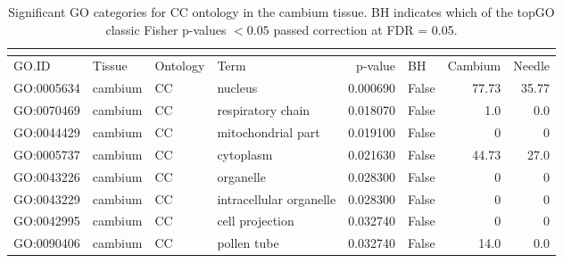 \begin{longtable}{llllrlrr}
\caption{Significant GO categories for CC ontology in the cambium tissue. BH indicates which of the topGO classic Fisher p-values $< 0.05$ passed correction at FDR = 0.05.}\\
\label{tab:go-cambium-CC}\\
\toprule
GO.ID & Tissue & Ontology & Term & p-value & BH & Cambium & Needle \\
\midrule
GO:0005634 & cambium & CC &   nucleus  & 0.000690 &   False  & 77.73 & 35.77 \\ 
GO:0070469 & cambium & CC &   respiratory chain  & 0.018070 &   False  & 1.0 & 0.0 \\ 
GO:0044429 & cambium & CC &   mitochondrial part  & 0.019100 &   False  & 0 & 0 \\
GO:0005737 & cambium & CC &   cytoplasm  & 0.021630 &   False  & 44.73 & 27.0 \\ 
GO:0043226 & cambium & CC &   organelle  & 0.028300 &   False  & 0 & 0 \\
GO:0043229 & cambium & CC &   intracellular organelle  & 0.028300 &   False  & 0 & 0 \\
GO:0042995 & cambium & CC &   cell projection  & 0.032740 &   False  & 0 & 0 \\
GO:0090406 & cambium & CC &   pollen tube  & 0.032740 &   False  & 14.0 & 0.0 \\ 
\bottomrule
\end{longtable}
